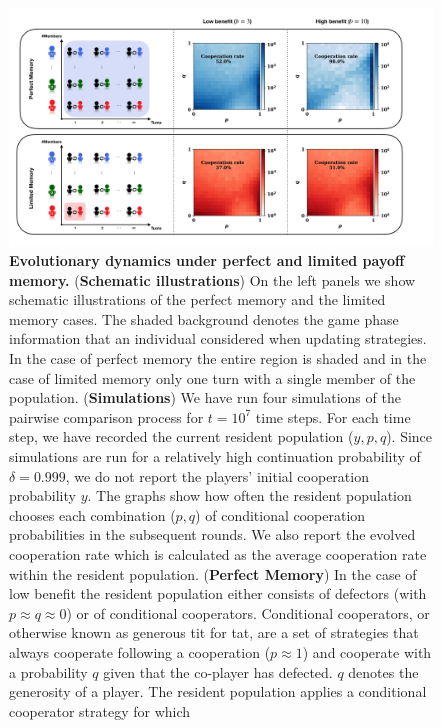 \documentclass[11pt]{article}
\theoremstyle{plainCl1}
\theoremstyle{plainCl2}
\begin{document}
\begin{figure}[!htbp]
    \centering
    \includegraphics[width=\textwidth]{static/donation_expected_last_round_summary_results.pdf}
    \caption{{\bf Evolutionary dynamics under perfect and limited payoff memory.}
    ({\bf Schematic illustrations})
    On the left panels we show schematic illustrations of the perfect memory and
    the limited memory cases. The shaded background denotes the game phase
    information that an individual considered when updating strategies. In the
    case of perfect memory the entire region is shaded and in the case of
    limited memory only one turn with a single member of the population.
    ({\bf Simulations})
    We have run four simulations of the pairwise comparison process
    for $t\!=\!10^7$ time steps. For each time step,
    we have recorded the current resident population ($y,p,q$). Since
    simulations are run for a relatively high continuation probability of
    $\delta\!=\!0.999$, we do not report the players' initial cooperation
    probability $y$. The graphs show how often the resident population chooses
    each combination ($p,q$) of conditional cooperation probabilities in the
    subsequent rounds. We also report the evolved cooperation rate which is
    calculated as the average cooperation rate within the resident population.
    ({\bf Perfect Memory}) In the case of low benefit
    the resident population either consists of defectors (with $p\!\approx\!q\!\approx\!0$) or of
    conditional cooperators. Conditional cooperators, or otherwise known as generous
    tit for tat, are a set of strategies that always cooperate following a cooperation
    ($p\!\approx\!1\!$) and cooperate with a probability
    $q$ given that the co-player has defected. $q$ denotes the generosity
    of a player. The resident population applies a conditional cooperator strategy for which
}
\end{figure}
\end{document}
